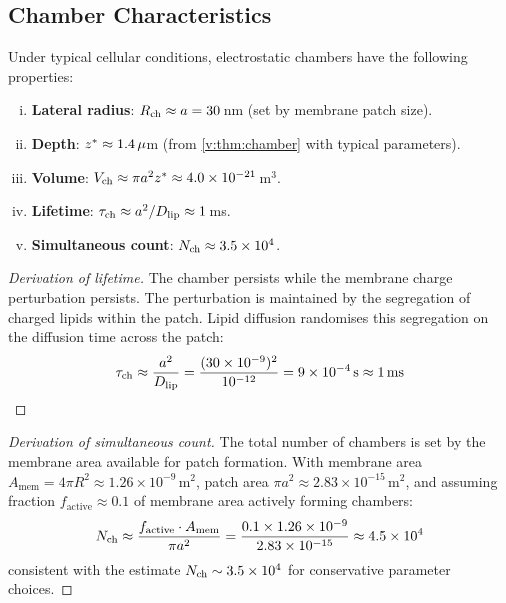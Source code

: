 \subsection{Chamber Characteristics}

\begin{proposition}
\label{v:prop:chamber_params}
Under typical cellular conditions, electrostatic chambers have the following properties:
\begin{enumerate}[(i)]
  \item \textbf{Lateral radius}: $R_{\mathrm{ch}} \approx a = 30$\,nm (set by membrane patch size).
  \item \textbf{Depth}: $z^{*} \approx 1.4\,\mu$m (from \cref{v:thm:chamber} with typical parameters).
  \item \textbf{Volume}: $V_{\mathrm{ch}} \approx \pi a^2 z^{*} \approx 4.0 \times 10^{-21}$\,m$^3$.
  \item \textbf{Lifetime}: $\tau_{\mathrm{ch}} \approx a^2 / D_{\mathrm{lip}} \approx 1$\,ms.
  \item \textbf{Simultaneous count}: $N_{\mathrm{ch}} \approx 3.5 \times 10^4$.
\end{enumerate}
\end{proposition}

\begin{proof}[Derivation of lifetime]
The chamber persists while the membrane charge perturbation persists. The perturbation is maintained by the segregation of charged lipids within the patch. Lipid diffusion randomises this segregation on the diffusion time across the patch:
\begin{equation}
  \tau_{\mathrm{ch}} \approx \frac{a^2}{D_{\mathrm{lip}}} = \frac{(30 \times 10^{-9})^2}{10^{-12}} = 9 \times 10^{-4}\,\mathrm{s} \approx 1\,\mathrm{ms}
\end{equation}
\end{proof}

\begin{proof}[Derivation of simultaneous count]
The total number of chambers is set by the membrane area available for patch formation. With membrane area $A_{\mathrm{mem}} = 4\pi R^2 \approx 1.26 \times 10^{-9}$\,m$^2$, patch area $\pi a^2 \approx 2.83 \times 10^{-15}$\,m$^2$, and assuming fraction $f_{\mathrm{active}} \approx 0.1$ of membrane area actively forming chambers:
\begin{equation}
  N_{\mathrm{ch}} \approx \frac{f_{\mathrm{active}} \cdot A_{\mathrm{mem}}}{\pi a^2} = \frac{0.1 \times 1.26 \times 10^{-9}}{2.83 \times 10^{-15}} \approx 4.5 \times 10^4
\end{equation}
consistent with the estimate $N_{\mathrm{ch}} \sim 3.5 \times 10^4$ for conservative parameter choices.
\end{proof}

